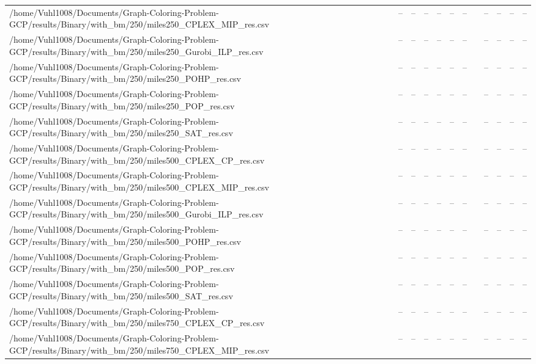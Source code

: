 \begin{table}[htbp]
\begin{tabular}{llllllllllll}
/home/Vuhl1008/Documents/Graph-Coloring-Problem-GCP/results/Binary/with\_bm/250/miles250\_CPLEX\_MIP\_res.csv & -- & -- & -- & -- & -- & -- & {} & -- & -- & -- & -- \\
/home/Vuhl1008/Documents/Graph-Coloring-Problem-GCP/results/Binary/with\_bm/250/miles250\_Gurobi\_ILP\_res.csv & -- & -- & -- & -- & -- & -- & {} & -- & -- & -- & -- \\
/home/Vuhl1008/Documents/Graph-Coloring-Problem-GCP/results/Binary/with\_bm/250/miles250\_POHP\_res.csv & -- & -- & -- & -- & -- & -- & {} & -- & -- & -- & -- \\
/home/Vuhl1008/Documents/Graph-Coloring-Problem-GCP/results/Binary/with\_bm/250/miles250\_POP\_res.csv & -- & -- & -- & -- & -- & -- & {} & -- & -- & -- & -- \\
/home/Vuhl1008/Documents/Graph-Coloring-Problem-GCP/results/Binary/with\_bm/250/miles250\_SAT\_res.csv & -- & -- & -- & -- & -- & -- & {} & -- & -- & -- & -- \\
/home/Vuhl1008/Documents/Graph-Coloring-Problem-GCP/results/Binary/with\_bm/250/miles500\_CPLEX\_CP\_res.csv & -- & -- & -- & -- & -- & -- & {} & -- & -- & -- & -- \\
/home/Vuhl1008/Documents/Graph-Coloring-Problem-GCP/results/Binary/with\_bm/250/miles500\_CPLEX\_MIP\_res.csv & -- & -- & -- & -- & -- & -- & {} & -- & -- & -- & -- \\
/home/Vuhl1008/Documents/Graph-Coloring-Problem-GCP/results/Binary/with\_bm/250/miles500\_Gurobi\_ILP\_res.csv & -- & -- & -- & -- & -- & -- & {} & -- & -- & -- & -- \\
/home/Vuhl1008/Documents/Graph-Coloring-Problem-GCP/results/Binary/with\_bm/250/miles500\_POHP\_res.csv & -- & -- & -- & -- & -- & -- & {} & -- & -- & -- & -- \\
/home/Vuhl1008/Documents/Graph-Coloring-Problem-GCP/results/Binary/with\_bm/250/miles500\_POP\_res.csv & -- & -- & -- & -- & -- & -- & {} & -- & -- & -- & -- \\
/home/Vuhl1008/Documents/Graph-Coloring-Problem-GCP/results/Binary/with\_bm/250/miles500\_SAT\_res.csv & -- & -- & -- & -- & -- & -- & {} & -- & -- & -- & -- \\
/home/Vuhl1008/Documents/Graph-Coloring-Problem-GCP/results/Binary/with\_bm/250/miles750\_CPLEX\_CP\_res.csv & -- & -- & -- & -- & -- & -- & {} & -- & -- & -- & -- \\
/home/Vuhl1008/Documents/Graph-Coloring-Problem-GCP/results/Binary/with\_bm/250/miles750\_CPLEX\_MIP\_res.csv & -- & -- & -- & -- & -- & -- & {} & -- & -- & -- & -- \\

\end{tabular}
\end{table}
